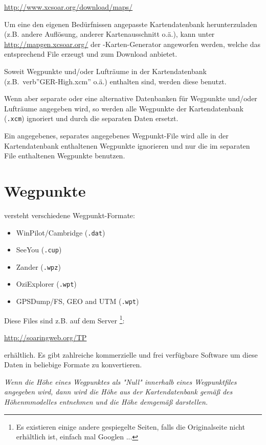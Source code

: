 \url{http://www.xcsoar.org/download/maps/}

Um eine den eigenen Bedürfnissen angepasste Kartendatenbank herunterzuladen (z.B. andere Auflösung,
anderer Kartenausschnitt o.ä.), kann unter \url{http://mapgen.xcsoar.org/}  der \xc-Karten-Generator
angeworfen werden, welche das entsprechend File erzeugt und zum Download
anbietet.

Soweit Wegpunkte und/oder Lufträume in der Kartendatenbank (z.B.\ verb''GER-High.xcm'' o.ä.) enthalten sind,
werden diese benutzt.

Wenn aber separate oder eine alternative Datenbanken für Wegpunkte und/oder Lufträume angegeben
wird, so werden alle Wegpunkte der Kartendatenbank (\verb".xcm") ignoriert und durch die separaten
Daten ersetzt.

Ein \xc angegebenes, separates angegebenes Wegpunkt-File wird alle in der Kartendatenbank enthaltenen
Wegpunkte ignorieren und nur die im separaten File enthaltenen Wegpunkte benutzen.



\section{Wegpunkte}
\xc  versteht verschiedene Wegpunkt-Formate:

\begin{itemize}
\item WinPilot/Cambridge (\verb|.dat|)
\item SeeYou (\verb|.cup|)
\item Zander (\verb|.wpz|)
\item OziExplorer (\verb|.wpt|)
\item GPSDump/FS, GEO and UTM (\verb|.wpt|)
\end{itemize}

Diese Files sind z.B. auf dem Server \footnote{Es existieren einige andere gespiegelte Seiten, falls die
Originalseite nicht erhältlich ist, einfach mal Googlen ...}:
\begin{center}
\url{http://soaringweb.org/TP}
\end{center}
erhältlich. Es gibt zahlreiche kommerzielle und frei verfügbare Software um diese Daten in beliebige Formate zu
konvertieren.

\achtung \textsl{Wenn die Höhe eines Wegpunktes als "Null" innerhalb eines Wegpunktfiles angegeben
wird, dann wird  \xc  die Höhe aus der Kartendatenbank gemäß des Höhenmmodelles entnehmen und die
Höhe demgemäß darstellen.}

